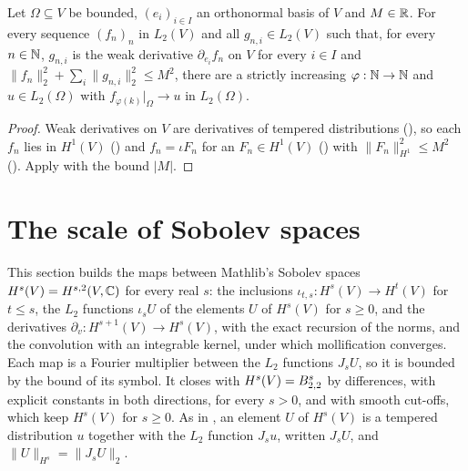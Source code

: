 \begin{corollary}
\label{cor:rellich-weak-gradient}
\leanok
{}
Let $\Omega \subseteq V$ be bounded, $(e_i)_{i \in I}$ an orthonormal basis of $V$ and
$M \in \mathbb{R}$. For every sequence $(f_n)_n$ in $L_2(V)$ and all $g_{n,i} \in L_2(V)$ such that,
for every $n \in \mathbb{N}$, $g_{n,i}$ is the weak derivative $\partial_{e_i} f_n$ on $V$ for every
$i \in I$ and $\|f_n\|_2^2 + \sum_i \|g_{n,i}\|_2^2 \leq M^2$, there are a strictly increasing
$\varphi : \mathbb{N} \to \mathbb{N}$ and $u \in L_2(\Omega)$ with $f_{\varphi(k)}|_\Omega \to u$ in
$L_2(\Omega)$.
\end{corollary}

\begin{proof}
\leanok
Weak derivatives on $V$ are derivatives of tempered distributions
(), so each $f_n$ lies in $H^1(V)$
() and $f_n = \iota F_n$ for an $F_n \in H^1(V)$
() with $\|F_n\|_{H^1}^2 \leq M^2$
(). Apply  with the bound
$|M|$.
\end{proof}

\section{The scale of Sobolev spaces}
\label{sec:sobolev-scale}

This section builds the maps between Mathlib's Sobolev spaces $H^s(V) = H^{s,2}(V, \mathbb{C})$ for
every real $s$: the inclusions $\iota_{t,s} : H^s(V) \to H^t(V)$ for $t \leq s$, the $L_2$
functions $\iota_s U$ of the elements $U$ of $H^s(V)$ for $s \geq 0$, and the derivatives
$\partial_v : H^{s+1}(V) \to H^s(V)$, with the exact recursion of the norms, and the
convolution with an integrable kernel, under which mollification converges. Each map is a
Fourier multiplier between the $L_2$ functions $J_s U$, so it is bounded by the bound of its
symbol. It closes with $H^s(V) = B^{s}_{2,2}$ by differences, with explicit constants in
both directions, for every $s > 0$, and with smooth cut-offs, which keep $H^s(V)$ for
$s \geq 0$. As in , an element $U$ of
$H^s(V)$ is a tempered distribution $u$ together with the $L_2$ function $J_s u$, written
$J_s U$, and $\|U\|_{H^s} = \|J_s U\|_2$.


